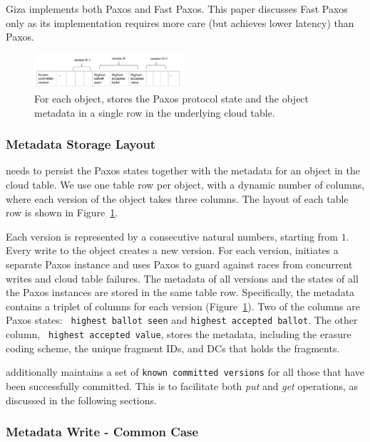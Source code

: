 Giza implements both Paxos and Fast Paxos. This paper discusses Fast Paxos only as
its implementation requires more care (but achieves lower latency) than Paxos.

\begin{figure}[tp]
\centering
\includegraphics[width=0.5\textwidth]{fig/Giza_Metadata}
\caption{For each object, \name stores the Paxos protocol state and the object metadata 
in a single row in the underlying cloud table.\label{fig:metadataschema}}
\end{figure}

\subsubsection{Metadata Storage Layout}

\name needs to persist the Paxos states together with the metadata for an object in the cloud table. 
We use one table row per object, with a dynamic number of columns,
where each version of the object takes three columns. The layout of each table row is
shown in Figure~\ref{fig:metadataschema}.

Each version is represented by a consecutive natural numbers, starting from $1$.
Every \name write to the object creates a new version. For each version, \name
initiates a separate Paxos instance and uses Paxos to guard against races from
concurrent writes and cloud table failures. The metadata of all versions and the
states of all the Paxos instances are stored in the same table row.
Specifically, the metadata contains a triplet of columns for each version
(Figure~\ref{fig:metadataschema}). Two of the columns are Paxos states: {\tt
  highest ballot seen} and {\tt highest accepted ballot}. The other column, {\tt
  highest accepted value}, stores the metadata, including the erasure coding
scheme, the unique fragment IDs, and DCs that holds the fragments.

{\name} additionally maintains a set of {\tt known committed versions} for all
those that have been successfully committed. This is to facilitate both {\em put}
and {\em get} operations, as discussed in the following sections.

\subsubsection{Metadata Write - Common Case}


